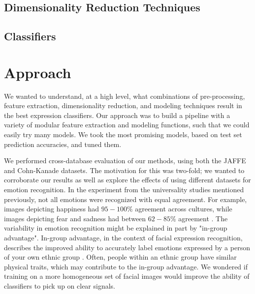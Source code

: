 \documentclass[10pt,twocolumn,letterpaper]{article}
\begin{document}





\subsection{Dimensionality Reduction Techniques}


\subsection{Classifiers}








\section{Approach}

We wanted to understand, at a high level, what combinations of pre-processing, feature extraction, dimensionality reduction, and modeling techniques result in the best expression classifiers. Our approach was to build a pipeline with a variety of modular feature extraction and modeling functions, such that we could easily try many models. We took the most promising models, based on test set prediction accuracies, and tuned them. 

We performed cross-database evaluation of our methods, using both the JAFFE and Cohn-Kanade datasets. The motivation for this was two-fold; we wanted to corroborate our results as well as explore the effects of using different datasets for emotion recognition. In the experiment from the universality studies mentioned previously, not all emotions were recognized with equal agreement. For example, images depicting happiness had $95-100\%$ agreement across cultures, while images depicting fear and sadness had between $62-85\%$ agreement \cite{universality_studies}. The variability in emotion recognition might be explained in part by "in-group advantage". In-group advantage, in the context of facial expression recognition, describes the improved ability to accurately label emotions expressed by a person of your own ethnic group \cite{universality}. Often, people within an ethnic group have similar physical traits, which may contribute to the in-group advantage. We wondered if training on a more homogeneous set of facial images would improve the ability of classifiers to pick up on clear signals.
\end{document}

